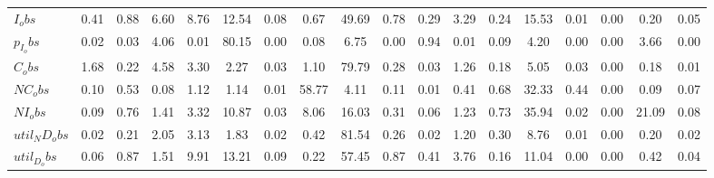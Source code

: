 \begin{center}
\begin{longtable}{lccccccccccccccccc}
$I_obs        $	 & 	            0.41	 & 	            0.88	 & 	            6.60	 & 	            8.76	 & 	           12.54	 & 	            0.08	 & 	            0.67	 & 	           49.69	 & 	            0.78	 & 	            0.29	 & 	            3.29	 & 	            0.24	 & 	           15.53	 & 	            0.01	 & 	            0.00	 & 	            0.20	 & 	            0.05 \\ 
$p_I_obs      $	 & 	            0.02	 & 	            0.03	 & 	            4.06	 & 	            0.01	 & 	           80.15	 & 	            0.00	 & 	            0.08	 & 	            6.75	 & 	            0.00	 & 	            0.94	 & 	            0.01	 & 	            0.09	 & 	            4.20	 & 	            0.00	 & 	            0.00	 & 	            3.66	 & 	            0.00 \\ 
$C_obs        $	 & 	            1.68	 & 	            0.22	 & 	            4.58	 & 	            3.30	 & 	            2.27	 & 	            0.03	 & 	            1.10	 & 	           79.79	 & 	            0.28	 & 	            0.03	 & 	            1.26	 & 	            0.18	 & 	            5.05	 & 	            0.03	 & 	            0.00	 & 	            0.18	 & 	            0.01 \\ 
$NC_obs       $	 & 	            0.10	 & 	            0.53	 & 	            0.08	 & 	            1.12	 & 	            1.14	 & 	            0.01	 & 	           58.77	 & 	            4.11	 & 	            0.11	 & 	            0.01	 & 	            0.41	 & 	            0.68	 & 	           32.33	 & 	            0.44	 & 	            0.00	 & 	            0.09	 & 	            0.07 \\ 
$NI_obs       $	 & 	            0.09	 & 	            0.76	 & 	            1.41	 & 	            3.32	 & 	           10.87	 & 	            0.03	 & 	            8.06	 & 	           16.03	 & 	            0.31	 & 	            0.06	 & 	            1.23	 & 	            0.73	 & 	           35.94	 & 	            0.02	 & 	            0.00	 & 	           21.09	 & 	            0.08 \\ 
$util_ND_obs  $	 & 	            0.02	 & 	            0.21	 & 	            2.05	 & 	            3.13	 & 	            1.83	 & 	            0.02	 & 	            0.42	 & 	           81.54	 & 	            0.26	 & 	            0.02	 & 	            1.20	 & 	            0.30	 & 	            8.76	 & 	            0.01	 & 	            0.00	 & 	            0.20	 & 	            0.02 \\ 
$util_D_obs   $	 & 	            0.06	 & 	            0.87	 & 	            1.51	 & 	            9.91	 & 	           13.21	 & 	            0.09	 & 	            0.22	 & 	           57.45	 & 	            0.87	 & 	            0.41	 & 	            3.76	 & 	            0.16	 & 	           11.04	 & 	            0.00	 & 	            0.00	 & 	            0.42	 & 	            0.04 \\ 

\end{longtable}
\end{center}
